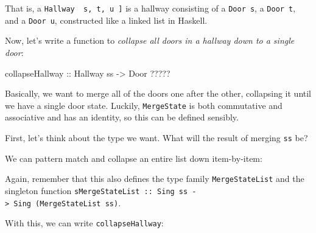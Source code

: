 \documentclass[]{article}
\newenvironment{Shaded}{}{}
\newcommand{\DataTypeTok}[1]{\textcolor[rgb]{0.56,0.13,0.00}{#1}}
\newcommand{\FunctionTok}[1]{\textcolor[rgb]{0.02,0.16,0.49}{#1}}
\newcommand{\NormalTok}[1]{#1}
\newcommand{\OtherTok}[1]{\textcolor[rgb]{0.00,0.44,0.13}{#1}}
\begin{document}
That is, a \texttt{Hallway\ \textquotesingle{}{[}\ s,\ t,\ u\ {]}} is a hallway
consisting of a \texttt{Door\ s}, a \texttt{Door\ t}, and a \texttt{Door\ u},
constructed like a linked list in Haskell.

Now, let's write a function to \emph{collapse all doors in a hallway down to a
single door}:

\begin{Shaded}
\begin{Highlighting}[]
\OtherTok{collapseHallway ::} \DataTypeTok{Hallway}\NormalTok{ ss }\OtherTok{->} \DataTypeTok{Door} \FunctionTok{?????}
\end{Highlighting}
\end{Shaded}

Basically, we want to merge all of the doors one after the other, collapsing it
until we have a single door state. Luckily, \texttt{MergeState} is both
commutative and associative and has an identity, so this can be defined
sensibly.

First, let's think about the type we want. What will the result of merging
\texttt{ss} be?

We can pattern match and collapse an entire list down item-by-item:

\begin{Shaded}
\end{Shaded}

Again, remember that this also defines the type family \texttt{MergeStateList}
and the singleton function
\texttt{sMergeStateList\ ::\ Sing\ ss\ -\textgreater{}\ Sing\ (MergeStateList\ ss)}.

With this, we can write \texttt{collapseHallway}:
\end{document}
